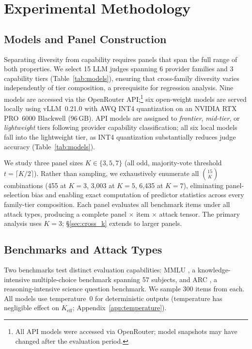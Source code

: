 \section{Experimental Methodology}
\label{sec:experiments}

\subsection{Models and Panel Construction}

Separating diversity from capability requires panels that span the full range of both properties. We select 15 LLM judges spanning 6 provider families and 3 capability tiers (Table~\ref{tab:models}), ensuring that cross-family diversity varies independently of tier composition, a prerequisite for regression analysis. Nine models are accessed via the OpenRouter API;\footnote{All API models were accessed via OpenRouter; model snapshots may have changed after the evaluation period.} six open-weight models are served locally using vLLM~0.21.0 with AWQ INT4 quantization on an NVIDIA RTX PRO~6000 Blackwell (96\,GB). API models are assigned to \emph{frontier}, \emph{mid-tier}, or \emph{lightweight} tiers following provider capability classification; all six local models fall into the lightweight tier, as INT4 quantization substantially reduces judge accuracy (Table~\ref{tab:models}).

We study three panel sizes $K \in \{3, 5, 7\}$ (all odd, majority-vote threshold $t = \lceil K/2 \rceil$). Rather than sampling, we exhaustively enumerate all $\binom{15}{K}$ combinations (455 at $K{=}3$, 3{,}003 at $K{=}5$, 6{,}435 at $K{=}7$), eliminating panel-selection bias and enabling exact computation of predictor statistics across every family-tier composition. Each panel evaluates all benchmark items under all attack types, producing a complete panel $\times$ item $\times$ attack tensor. The primary analysis uses $K{=}3$; \S\ref{sec:cross_k} extends to larger panels.

\subsection{Benchmarks and Attack Types}

Two benchmarks test distinct evaluation capabilities: MMLU \citep{hendrycks2021mmlu}, a knowledge-intensive multiple-choice benchmark spanning 57 subjects, and ARC \citep{clark2018arc}, a reasoning-intensive science question benchmark. We sample 300 items from each. All models use temperature~0 for deterministic outputs (temperature has negligible effect on $K_{\mathrm{eff}}$; Appendix~\ref{app:temperature}).

